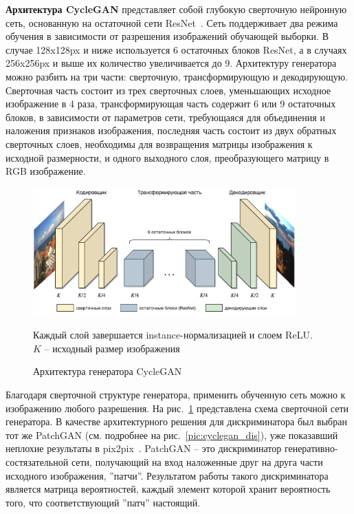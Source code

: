 \documentclass[11pt,a4paper]{extarticle}
\begin{document}
			\textbf{Архитектура CycleGAN} представляет собой глубокую сверточную нейронную сеть, основанную на остаточной сети ResNet~\cite{resnet}.
			Сеть поддерживает два режима обучения в зависимости от разрешения изображений обучающей выборки.
			В случае 128x128px и ниже используется 6 остаточных блоков ResNet, а в случаях 256x256px и выше их количество увеличивается до 9.
			Архитектуру генератора можно разбить на три части: сверточную, трансформирующую и декодирующую.
			Сверточная часть состоит из трех сверточных слоев, уменьшающих исходное изображение в 4 раза,
			трансформирующая часть содержит 6 или 9 остаточных блоков, в зависимости от параметров сети, требующаяся для объединения и наложения признаков изображения,
			последняя часть состоит из двух обратных сверточных слоев, необходимы для возвращения матрицы изображения к исходной размерности, и одного выходного слоя, преобразующего матрицу в RGB изображение.
			
			\begin{figure}[ht]
				\centering
				\includegraphics[width=0.9\textwidth]{img/cyclegan_gen}
				\caption{Архитектура генератора CycleGAN}{
					\small{
						Каждый слой завершается instance-нормализацией и слоем ReLU.\\
						$K$ -- исходный размер изображения

					}
				}
				\label{pic:cyclegan_gen}
			\end{figure}
			\noindent
			Благодаря сверточной структуре генератора, применить обученную сеть можно к изображению любого разрешения.
			На рис.~\ref{pic:cyclegan_gen} представлена схема сверточной сети генератора.
			В качестве архитектурного решения для дискриминатора был выбран тот же PatchGAN (см. подробнее на рис.~\ref{pic:cyclegan_dis}), уже показавший неплохие результаты в pix2pix~\cite{pix2pix}.
			PatchGAN -- это дискриминатор генеративно-состязательной сети, получающий на вход наложенные друг на друга части исходного изображения, ''патчи''.
			Результатом работы такого дискриминатора является матрица вероятностей, каждый элемент которой хранит вероятность того, что соответствующий ''патч'' настоящий.
			
\end{document}
